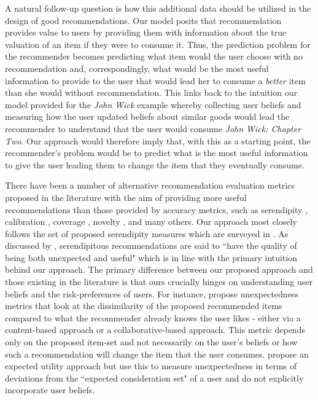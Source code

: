 \documentclass[manuscript]{acmart}
\begin{document}
\par 
A natural follow-up question is how this additional data should be utilized in the design of good recommendations. Our model posits that recommendation provides value to users by providing them with information about the true valuation of an item if they were to consume it. Thus, the prediction problem for the recommender becomes predicting what item would the user choose with no recommendation and, correspondingly, what would be the most useful information to provide to the user that would lead her to consume a \textit{better} item than she would without recommendation. This links back to the intuition our model provided for the \textit{John Wick} example whereby collecting user beliefs and measuring how the user updated beliefs about similar goods would lead the recommender to understand that the user would consume \textit{John Wick: Chapter Two}. Our approach would therefore imply that, with this as a starting point, the recommender's problem would be to predict what is the most useful information to give the user leading them to change the item that they eventually consume.
\par 
There have been a number of alternative recommendation evaluation metrics proposed in the literature with the aim of providing more useful recommendations than those provided by accuracy metrics, such as serendipity \cite{kotkov2016survey}, calibration \cite{steck2018calibrated}, coverage \cite{ge2010beyond}, novelty \cite{vargas2011rank}, and many others. Our approach most closely follows the set of proposed serendipity measures which are surveyed in \cite{kotkov2016survey}. As discussed by \cite{maksai2015predicting},  serendipitous recommendations are said to ``have the quality of being both unexpected and useful" which is in line with the primary intuition behind our approach. The primary difference between our proposed approach and those existing in the literature is that ours crucially hinges on understanding user beliefs and the risk-preferences of users. For instance, \cite{vargas2011rank, kaminskas2014measuring} propose unexpectedness metrics that look at the dissimilarity of the proposed recommended items compared to what the recommender already knows the user likes - either via a content-based approach or a collaborative-based approach. This metric depends only on the proposed item-set and not necessarily on the user's beliefs or how such a recommendation will change the item that the user consumes. \cite{adamopoulos2015unexpectedness} propose an expected utility approach but use this to measure unexpectedness in terms of deviations from the ``expected consideration set" of a user and do not explicitly incorporate user beliefs.
\end{document}
